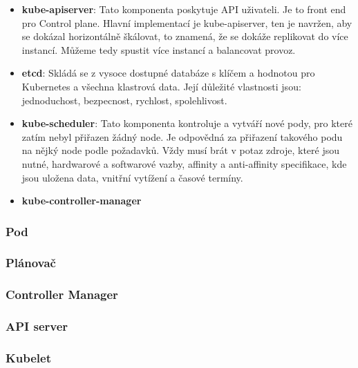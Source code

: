 \begin{itemize}
	\item \textbf{kube-apiserver}: Tato komponenta poskytuje API uživateli. Je to front end pro Control plane. Hlavní implementací je kube-apiserver, ten je navržen, aby se dokázal horizontálně škálovat, to znamená, že se dokáže replikovat do více instancí. Můžeme tedy spustit více instancí a balancovat provoz. 
	\item \textbf{etcd}: Skládá se z vysoce dostupné databáze s klíčem a hodnotou pro Kubernetes a všechna klastrová data. Její důležité vlastnosti jsou: jednoduchost, bezpecnost, rychlost, spolehlivost. 
	\item \textbf{kube-scheduler}: Tato komponenta kontroluje a vytváří nové pody, pro které zatím nebyl přiřazen žádný node. Je odpovědná za přiřazení takového podu na nějký node podle požadavků. Vždy musí brát v potaz zdroje, které jsou nutné, hardwarové a softwarové vazby, affinity a anti-affinity specifikace, kde jsou uložena data, vnitřní vytížení a časové termíny.
	\item \textbf{kube-controller-manager}
\end{itemize}

\subsubsection{Pod}



\subsubsection{Plánovač}



\subsubsection{Controller Manager}



\subsubsection{API server}



\subsubsection{Kubelet}



